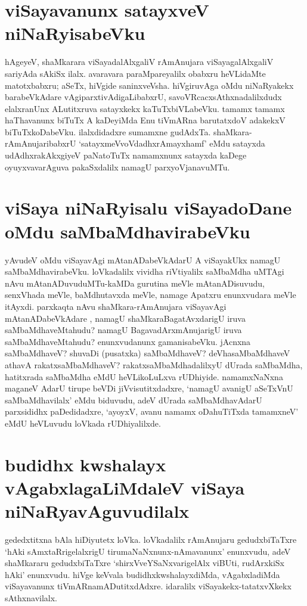 \section*{viSayavanunx satayxveV niNaRyisabeVku}

hAgeyeV, shaMkarara viSayadalAlxgaliV rAmAnujara viSayagalAlxgaliV sariyAda sAkiSx ilalx. avaravara paraMpareyalilx obabxru heVLidaMte matotxbabxru; aSeTx, hiVgide saninxveVsha. hiVgiruvAga oMdu niNaRyakekx barabeVkAdare vAgiparxtivAdigaLibabxrU, savoVRcacxsAthxnadalilxdudx elalxranUnx ALutitxruva satayxkekx kaTuTxbiVLabeVku. tamamx tamamx haThavanunx biTuTx A kaDeyiMda Enu tiVmARna barutatxdoV adakekxV biTuTxkoDabeVku. ilalxdidadxre sumamxne gudAdxTa. shaMkara-rAmAnujaribabxrU `satayxmeVvoVdadhxrAmayxhamf'\label{40} eMdu satayxda udAdhxrakAkxgiyeV paNatoTuTx namamxnunx satayxda kaDege oyuyxvavarAguva pakaSxdalilx namagU parxyoVjanavuMTu.

\section*{viSaya niNaRyisalu viSayadoDane oMdu saMbaMdhavirabeVku}

yAvudeV oMdu viSayavAgi mAtanADabeVkAdarU A viSayakUkx namagU saMbaMdhavirabeVku. loVkadalilx vividha riVtiyalilx saMbaMdha uMTAgi nAvu mAtanADuvuduMTu-kaMDa gurutina meVle mAtanADisuvudu, senxVhada meVle, baMdhutavxda meVle, namage Apatxru enunxvudara meVle itAyxdi. parxkaqta nAvu shaMkara-rAmAnujara viSayavAgi mAtanADabeVkAdare , namagU shaMkaraBagatAvxdarigU iruva saMbaMdhaveMtahudu? namagU BagavadArxmAnujarigU iruva saMbaMdhaveMtahudu? enunxvudanunx gamanisabeVku. jAcnxna saMbaMdhaveV? shuvaDi (pusatxka) saMbaMdhaveV? deVhasaMbaMdhaveV athavA rakatxsaMbaMdhaveV? rakatxsaMbaMdhadalilxyU dUrada saMbaMdha, hatitxrada saMbaMdha eMdU heVLikoLuLxva rUDhiyide. namamxNaNxna maganeV AdarU tirupe beVDi jiVvisutitxdadxre, `namagU avanigU aSeTxVnU saMbaMdhavilalx' eMdu biduvudu, adeV dUrada saMbaMdhavAdarU parxsididhx paDedidadxre, `ayoyxV, avanu namamx oDahuTiTxda tamamxneV' eMdU heVLuvudu loVkada rUDhiyalilxde.

\section*{budidhx kwshalayx vAgabxlagaLiMdaleV viSaya niNaRyavAguvudilalx}

gededxtitxna bAla hiDiyutetx loVka. loVkadalilx rAmAnujaru gedudxbiTaTxre `hAki sAmxtaRrigelalxrigU tirumaNaNxnunx-nAmavanunx' enunxvudu, adeV shaMkararu gedudxbiTaTxre `shirxVveYSaNxvarigelAlx viBUti, rudArxkiSx hAki' enunxvudu. hiVge keVvala budidhxkwshalayxdiMda, vAgabxladiMda viSayavanunx  tiVmARnamADutitxdAdxre. idaralilx viSayakekx-tatatxvXkekx sAthxnavilalx.

